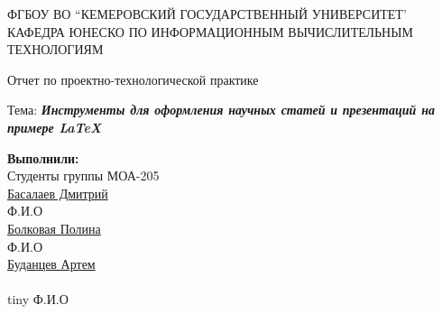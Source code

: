 \documentclass[11pt, a4paper]{report}
\begin{document}
\author{Буданцев Артем}

\begin{titlepage}

\begin{center}
{\large ФГБОУ ВО ``КЕМЕРОВСКИЙ ГОСУДАРСТВЕННЫЙ УНИВЕРСИТЕТ'\\ КАФЕДРА ЮНЕСКО ПО ИНФОРМАЦИОННЫМ ВЫЧИСЛИТЕЛЬНЫМ ТЕХНОЛОГИЯМ}

\vspace{6cm}

{\huge Отчет по проектно-технологической практике}
\par\bigskip
{\Large Тема: \textbf{\textit{Инструменты для оформления научных статей и презентаций на примере \LaTeX}}}
 \end{center}
 
 \vspace{5cm}

\begin{flushright}
{\Large \textbf{Выполнили:}}\\
Студенты группы МОА-205\\
\underline{Басалаев Дмитрий}\\
{\tiny Ф.И.О}\\
\underline{Болковая Полина}\\
{\tiny Ф.И.О}\\
\underline{Буданцев Артем}\\
{\\tiny Ф.И.О}\\





\end{flushright}





\end{titlepage}
\end{document}
